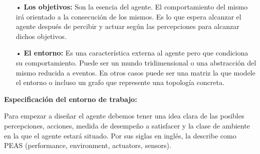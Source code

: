 \begin{itemize}
Inicialmente, la función del agente para un agente artificial se implementará mediante el programa del agente. Es importante diferenciar estas dos ideas. La función del agente es una descripción matemática abstracta; el programa del agente es una implementación completa, que se ejecuta sobre la arquitectura del agente. 
\vskip 0.1cm

En general, la arquitectura pone al alcance del programa las percepciones obtenidas mediante los sen­sores, lo ejecuta y alimenta al efector con las acciones elegidas por el programa conforme éstas se van generando. La relación entre agentes, arquitectura y programas podría resumirse de la siguiente manera:
\vskip 0.1cm

\begin{center}
{\bf Agente = Arquitectura + Programa}
\end{center}

Obviamente, el programa que se elija tiene que ser apropiado para la arquitectura. Si el programa tiene que recomendar acciones como Caminar, la arquitectura tiene que tener piernas. La arquitectura puede ser un PC común, o puede ser un coche robotizado con varios computadores, cámaras, y otros sensores a bordo. En general, la arquitectura hace que las percepciones de los sensores estén disponibles para el programa, ejecuta los programas, y se encarga de que los actuadores pongan en marcha las acciones generadas. (Russel)

\item[•] {\bf Los objetivos:}
\vskip 0.1cm Son la esencia del agente. El comportamiento del mismo irá orientado a la consecución de los mismos. Es lo que espera alcanzar el agente después de percibir y actuar según las percepciones para alcanzar dichos objetivos. 

\item[•] {\bf El entorno:}
\vskip 0.1cm Es una característica externa al agente pero que condiciona su comportamiento. Puede ser un mundo tridimensional o una abstracción del mismo reducida a eventos. En otros casos puede ser una matriz la que modele el entorno o incluso un grafo que represente una topología concreta.

\end{itemize}

{\bf Especificación del entorno de trabajo:}
 
Para empezar a diseñar el agente debemos tener una idea clara de las posibles percepciones, acciones, medida de desempeño a satisfacer y la clase de ambiente en la que el agente estará situado. Por sus siglas en inglés, \cite{Russel} la describe como PEAS (performance, environment, actuators, sensors). 

